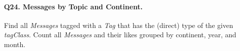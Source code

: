 \paragraph{\textbf{Q24}. Messages by Topic and Continent.}
Find all \emph{Messages} tagged with a \emph{Tag} that has the (direct)
type of the given \emph{tagClass}.
Count all \emph{Messages} and their likes grouped by continent, year,
and month.
